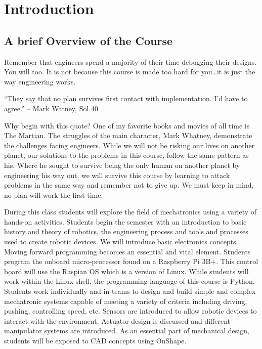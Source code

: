 \documentclass[
]{book}
\begin{document}
\hypertarget{intro}{%
\chapter{Introduction}\label{intro}}

\hypertarget{a-brief-overview-of-the-course}{%
\section{A brief Overview of the Course}\label{a-brief-overview-of-the-course}}

Remember that engineers spend a majority of their time debugging their designs. You will too. It is not because this course is made too hard for you\ldots it is just the way engineering works.

``They say that no plan survives first contact with implementation. I'd have to agree.'' -- Mark Watney, Sol 40

Why begin with this quote? One of my favorite books and movies of all time is The Martian. The struggles of the main character, Mark Whatney, demonstrate the challenges facing engineers. While we will not be risking our lives on another planet, our solutions to the problems in this course, follow the same pattern as his. Where he sought to survive being the only human on another planet by engineering his way out, we will survive this course by learning to attack problems in the same way and remember not to give up. We must keep in mind, no plan will work the first time.

During this class students will explore the field of mechatronics using a variety of hands-on activities. Students begin the semester with an introduction to basic history and theory of robotics, the engineering process and tools and processes used to create robotic devices. We will introduce basic electronics concepts. Moving forward programming becomes an essential and vital element. Students program the onboard micro-processor found on a Raspberry Pi 3B+. This control board will use the Raspian OS which is a version of Linux. While students will work within the Linux shell, the programming language of this course is Python. Students work individually and in teams to design and build simple and complex mechatronic systems capable of meeting a variety of criteria including driving, pushing, controlling speed, etc. Sensors are introduced to allow robotic devices to interact with the environment. Actuator design is discussed and different manipulator systems are introduced. As an essential part of mechanical design, students will be exposed to CAD concepts using OnShape.
\end{document}
